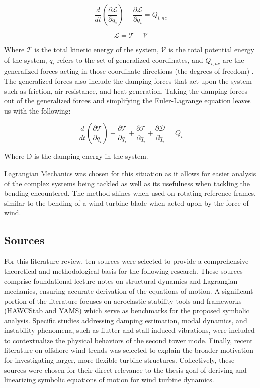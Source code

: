 \documentclass[onecolumn,draftcls]{IEEEtran}
\begin{document}
\begin{equation}
    \label{eq:lagrange}
    \frac{d}{dt}\left(\frac{\partial\mathcal{L}}{\partial\dot{q}_i}\right)-\frac{\partial\mathcal{L}}{\partial q_i}=Q_{i,nc}
\end{equation}

\begin{equation}
    \label{eq:lagrangian}
    \mathcal{L}=\mathcal{T}-\mathcal{V}
\end{equation}

Where $\mathcal{T}$ is the total kinetic energy of the system, $\mathcal{V}$ is the total potential energy of the system, $q_i$ refers to the set of generalized coordinates, and $Q_{i,nc}$ are the generalized forces acting in those coordinate directions (the degrees of freedom) \cite{Branlard2025notes}. The generalized forces also include the damping forces that act upon the system such as friction, air resistance, and heat generation. Taking the damping forces out of the generalized forces and simplifying the Euler-Lagrange equation leaves us with the following:

\begin{equation}
    \label{eq:euler_lagrange}
    \frac{d}{dt}\left(\frac{\partial\mathcal{T}}{\partial\dot{q}_i}\right)-\frac{\partial\mathcal{T}}{\partial q_i}+
    \frac{\partial\mathcal{T}}{\partial q_i}+
    \frac{\partial\mathcal{D}}{\partial\dot{q}_i} =
    Q_{i}
\end{equation}

Where D is the damping energy in the system.

Lagrangian Mechanics was chosen for this situation as it allows for easier analysis of the complex systems being tackled as well as its usefulness when tackling the bending encountered. The method shines when used on rotating reference frames, similar to the bending of a wind turbine blade when acted upon by the force of wind.


\subsection*{Sources}
For this literature review, ten sources were selected to provide a comprehensive theoretical and methodological basis for the following research. These sources comprise foundational lecture notes on structural dynamics and Lagrangian mechanics, ensuring accurate derivation of the equations of motion. A significant portion of the literature focuses on aeroelastic stability tools and frameworks (HAWCStab and YAMS) which serve as benchmarks for the proposed symbolic analysis. Specific studies addressing damping estimation, modal dynamics, and instability phenomena, such as flutter and stall-induced vibrations, were included to contextualize the physical behaviors of the second tower mode. Finally, recent literature on offshore wind trends was selected to explain the broader motivation for investigating larger, more flexible turbine structures. Collectively, these sources were chosen for their direct relevance to the thesis goal of deriving and linearizing symbolic equations of motion for wind turbine dynamics.
\end{document}
